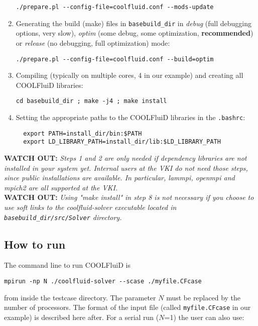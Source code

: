 \documentclass[11pt]{article}
\begin{document}
\begin{enumerate}
\begin{verbatim}
./prepare.pl --config-file=coolfluid.conf --mods-update
\end{verbatim}
\item
  Generating the build (make) files in \texttt{basebuild\_dir} in \textit{debug} (full debugging options, very slow), 
  \textit{optim} (some debug, some optimization, \textbf{recommended}) or \textit{release} (no debugging, full optimization) mode:
\begin{verbatim}
./prepare.pl --config-file=coolfluid.conf --build=optim
\end{verbatim}
\item 
  Compiling (typically on multiple cores, 4 in our example) and creating all COOLFluiD libraries:
\begin{verbatim}
cd basebuild_dir ; make -j4 ; make install
\end{verbatim}
\item 
  Setting the appropriate paths to the COOLFluiD libraries in the \texttt{.bashrc}:
\begin{verbatim}
  export PATH=install_dir/bin:$PATH
  export LD_LIBRARY_PATH=install_dir/lib:$LD_LIBRARY_PATH
\end{verbatim}  
\end{enumerate}

{\bf WATCH OUT:} {\it Steps 1 and 2 are only needed if dependency libraries are not installed in your system yet. Internal users at the VKI do not need those steps, since public installations are available. In particular, lammpi, openmpi and mpich2 are all supported at the VKI.
}  \\

{\bf WATCH OUT:} {\it Using "make install" in step 8 is not necessary if you choose to use soft links to the coolfluid-solver executable located in
  \texttt{basebuild\_dir/src/Solver} directory.  
}

\subsection{How to run}

The command line to run COOLFluiD is 

\begin{verbatim}
mpirun -np N ./coolfluid-solver --scase ./myfile.CFcase
\end{verbatim}
from inside the testcase directory. The parameter $N$ must be replaced by the number of 
processors. The format of the input file (called {\tt myfile.CFcase} in our example) is described here after.
For a serial run ($N$=1) the user can also use:
\end{document}
